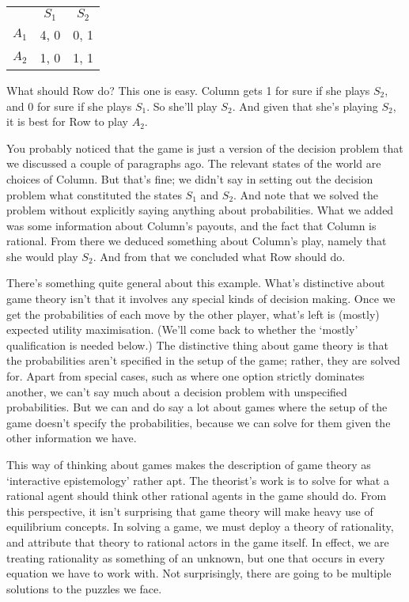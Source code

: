\begin{center}
\begin{tabular}{r c c}
 & $S_1$ & $S_2$ \\
$A_1$ & 4, 0 & 0, 1 \\
$A_2$ & 1, 0 & 1, 1 
\end{tabular}
\end{center}

\noindent What should Row do? This one is easy. Column gets 1 for sure if she plays $S_2$, and 0 for sure if she plays $S_1$. So she'll play $S_2$. And given that she's playing $S_2$, it is best for Row to play $A_2$.

You probably noticed that the game is just a version of the decision problem that we discussed a couple of paragraphs ago. The relevant states of the world are choices of Column. But that's fine; we didn't say in setting out the decision problem what constituted the states $S_1$ and $S_2$. And note that we solved the problem without explicitly saying anything about probabilities. What we added was some information about Column's payouts, and the fact that Column is rational. From there we deduced something about Column's play, namely that she would play $S_2$. And from that we concluded what Row should do.

There's something quite general about this example. What's distinctive about game theory isn't that it involves any special kinds of decision making. Once we get the probabilities of each move by the other player, what's left is (mostly) expected utility maximisation. (We'll come back to whether the `mostly' qualification is needed below.) The distinctive thing about game theory is that the probabilities aren't specified in the setup of the game; rather, they are solved for. Apart from special cases, such as where one option strictly dominates another, we can't say much about a decision problem with unspecified probabilities. But we can and do say a lot about games where the setup of the game doesn't specify the probabilities, because we can solve for them given the other information we have.

This way of thinking about games makes the description of game theory as `interactive epistemology' \citep{Aumann1999} rather apt. The theorist's work is to solve for what a rational agent should think other rational agents in the game should do. From this perspective, it isn't surprising that game theory will make heavy use of equilibrium concepts. In solving a game, we must deploy a theory of rationality, and attribute that theory to rational actors in the game itself. In effect, we are treating rationality as something of an unknown, but one that occurs in every equation we have to work with. Not surprisingly, there are going to be multiple solutions to the puzzles we face.

